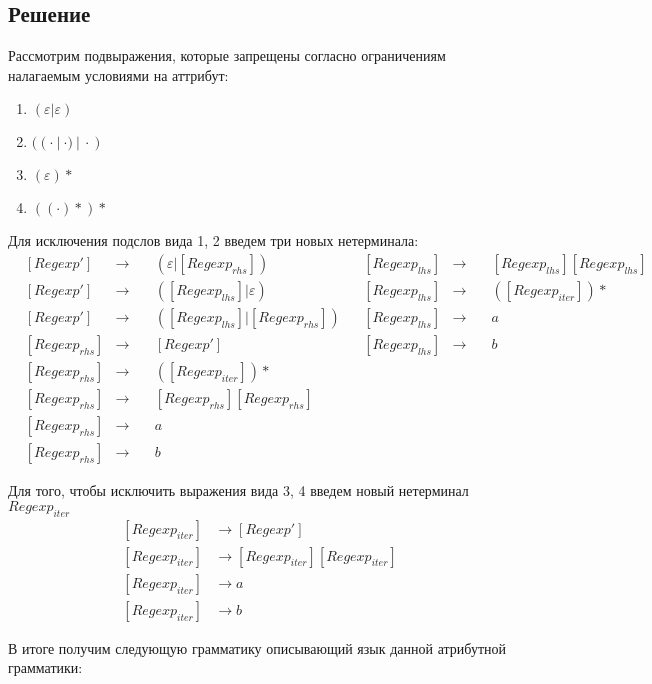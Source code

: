 \documentclass[a4paper, 14pt]{article}
\begin{document}
\subsection{Решение}

Рассмотрим подвыражения, которые запрещены согласно ограничениям налагаемым условиями на аттрибут:

\begin{enumerate}
  \item{$(\varepsilon | \varepsilon)$}
  \item{$((\cdot \ | \ \cdot )\ | \ \cdot)$}
  \item{$(\varepsilon)*$}
  \item{$((\cdot)*)*$}
\end{enumerate}

Для исключения подслов вида 1, 2 введем три новых нетерминала:
$$
\begin{aligned}
  &[Regexp'] &\rightarrow \quad &{(\varepsilon|[Regexp_{rhs}])} & &[Regexp_{lhs}] &\rightarrow \quad &{[Regexp_{lhs}][Regexp_{lhs}]} \\
  &[Regexp'] &\rightarrow \quad &{([Regexp_{lhs}]|\varepsilon)} & &[Regexp_{lhs}] &\rightarrow \quad  &{([Regexp_{iter}])*} \\
  &[Regexp'] &\rightarrow \quad &{([Regexp_{lhs}]|[Regexp_{rhs}])} & &[Regexp_{lhs}] &\rightarrow \quad  &a\\ 
  &[Regexp_{rhs}] &\rightarrow \quad &{[Regexp']}  & &[Regexp_{lhs}] &\rightarrow \quad  &b\\ 
  &[Regexp_{rhs}] &\rightarrow \quad &{([Regexp_{iter}])*} \\
  &[Regexp_{rhs}] &\rightarrow \quad &{[Regexp_{rhs}][Regexp_{rhs}]} \\
  &[Regexp_{rhs}] &\rightarrow \quad &a \\
  &[Regexp_{rhs}] &\rightarrow \quad &b
\end{aligned}
$$


Для того, чтобы исключить выражения вида 3, 4 введем новый нетерминал $Regexp_{iter}$
$$
\begin{aligned}
  [Regexp_{iter}] &\rightarrow [Regexp'] \\
  [Regexp_{iter}] &\rightarrow [Regexp_{iter}][Regexp_{iter}] \\
  [Regexp_{iter}] &\rightarrow a \\
  [Regexp_{iter}] &\rightarrow b
\end{aligned}
$$


В итоге получим следующую грамматику описывающий язык данной атрибутной грамматики: 
\end{document}
